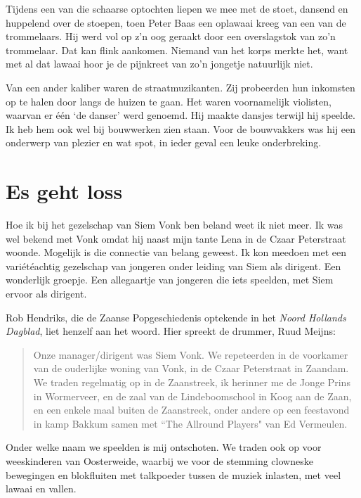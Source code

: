 \documentclass[12pt,twoside, openright]{memoir}
\begin{document}
Tijdens een van die schaarse optochten liepen we mee met de stoet, dansend en huppelend over de stoepen, toen Peter Baas een oplawaai kreeg van een van de trommelaars. Hij werd vol op z’n oog geraakt door een overslagstok van zo’n trommelaar. 
Dat kan flink aankomen. Niemand van het korps merkte het, want met al dat lawaai hoor je de pijnkreet van zo’n jongetje natuurlijk niet.

Van een ander kaliber waren de straatmuzikanten. Zij probeerden hun inkomsten op te halen door langs de huizen te gaan. Het waren voornamelijk violisten, waarvan er één ‘de danser’ werd genoemd. Hij maakte dansjes terwijl hij speelde. Ik heb hem ook wel bij bouwwerken zien staan. Voor de bouwvakkers was hij een onderwerp van plezier en wat spot, in ieder geval een leuke onderbreking.


\section*{Es geht loss} %
\label{cha:gehtloss}

Hoe ik bij het gezelschap van Siem Vonk ben beland weet ik niet meer. Ik was wel bekend met Vonk omdat hij naast mijn tante Lena in de Czaar Peterstraat woonde. Mogelijk is die connectie van belang geweest. Ik kon meedoen met een variétéachtig gezelschap van jongeren onder leiding van Siem als dirigent. Een wonderlijk groepje. Een allegaartje van jongeren die iets speelden, met Siem ervoor als dirigent.

Rob Hendriks, die de Zaanse Popgeschiedenis optekende in het \emph{Noord Hollands Dagblad}, liet henzelf aan het woord. Hier spreekt de drummer, Ruud Meijns: 

\begin{quote}
Onze manager/dirigent was Siem Vonk. We repeteerden in de voorkamer van de ouderlijke woning van Vonk, in de Czaar Peterstraat in Zaandam. We traden regelmatig op in de Zaanstreek, ik herinner me de Jonge Prins in Wormerveer, en de zaal van de Lindeboomschool in Koog aan de Zaan, en een enkele maal buiten de Zaanstreek, onder andere op een feestavond in kamp Bakkum samen met ``The Allround Players" van Ed Vermeulen.
\end{quote}

Onder welke naam we speelden is mij ontschoten. We traden ook op voor weeskinderen van Oosterweide, waarbij we voor de stemming clowneske bewegingen en blokfluiten met talkpoeder tussen de muziek inlasten, met veel lawaai en vallen. 
\end{document}
